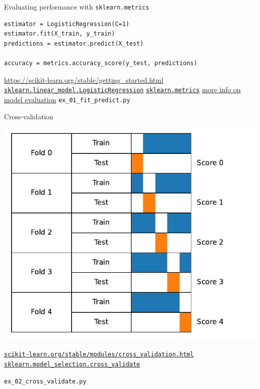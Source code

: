 \documentclass[presentation,mathserif,table]{beamer}
\begin{document}
\begin{frame}[label={sec:orgff4bd2d},fragile]{Evaluating performance with \texttt{sklearn.metrics}}
 \begin{verbatim}
estimator = LogisticRegression(C=1)
estimator.fit(X_train, y_train)
predictions = estimator.predict(X_test)

accuracy = metrics.accuracy_score(y_test, predictions)
\end{verbatim}
\vfill
\url{https://scikit-learn.org/stable/getting\_started.html}
\href{https://scikit-learn.org/stable/modules/generated/sklearn.linear\_model.LogisticRegression.html}{\texttt{sklearn.linear\_model.LogisticRegression}}
\href{https://scikit-learn.org/stable/modules/classes.html\#module-sklearn.metrics}{\texttt{sklearn.metrics}}
\href{https://scikit-learn.org/stable/modules/model\_evaluation.html\#the-scoring-parameter-defining-model-evaluation-rules}{more info on model evaluation}
\vfill
\texttt{ex\_01\_fit\_predict.py}
\end{frame}
\begin{frame}[label={sec:org981bc55},fragile]{Cross-validation}
 \begin{center}
\includegraphics[height=.7 \textheight]{cv_figure_simple.pdf}
\end{center}

\href{https://scikit-learn.org/stable/modules/cross\_validation.html}{\texttt{scikit-learn.org/stable/modules/cross\_validation.html}}
\href{https://scikit-learn.org/stable/modules/generated/sklearn.model\_selection.GridSearchCV.html}{\texttt{sklearn.model\_selection.cross\_validate}}

\texttt{ex\_02\_cross\_validate.py}
\end{frame}
\end{document}
